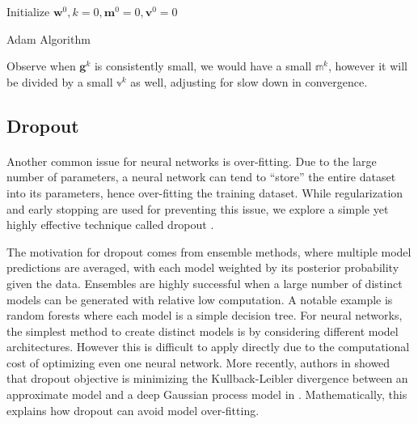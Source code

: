 \begin{algorithm}[H]
 Initialize $\mathbf{w}^0, k=0, \mathbf{m}^0 = 0,
 \mathbf{v}^0 = 0$\;
 \caption{Adam Algorithm}
\end{algorithm}

Observe when $\mathbf{g}^k$ is consistently small,
we would have a small $\mathbb{m}^k$,
however it will be divided by a small $\mathbb{v}^k$ as well,
adjusting for slow down in convergence.






\subsection{Dropout} \label{subsc:dropout}

\paragraph{}
Another common issue for neural networks is over-fitting.
Due to the large number of parameters, 
a neural network can tend to ``store'' the entire dataset 
into its parameters, 
hence over-fitting the training dataset.
While regularization and early stopping are used for 
preventing this issue,
we explore a simple yet highly effective 
technique called dropout \cite{SrHi14}.

The motivation for dropout comes from ensemble methods,
where multiple model predictions are averaged,
with each model weighted by its posterior probability 
given the data.
Ensembles are highly successful when
a large number of distinct models can be generated with 
relative low computation.
A notable example is random forests \cite{Br01}
where each model is a simple decision tree.
For neural networks, 
the simplest method to create distinct models 
is by considering different model architectures.
However this is difficult to apply directly
due to the computational cost of optimizing even 
one neural network.
More recently, authors in \cite{GaGh15} showed 
that dropout objective is minimizing the
Kullback-Leibler divergence between an approximate 
model and a deep Gaussian process model in \cite{DaLa12}. 
Mathematically, this explains how dropout
can avoid model over-fitting.

